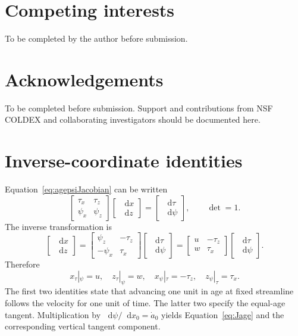 \documentclass[review]{igs}
\theoremstyle{definition}
\theoremstyle{remark}
\newcommand{\dd}{\mathop{}\!\mathrm{d}}
\begin{document}
\section*{Competing interests}
To be completed by the author before submission.

\section*{Acknowledgements}
To be completed before submission. Support and contributions from NSF COLDEX and collaborating investigators should be documented here.




\appendix

\section{Inverse-coordinate identities}
\label{app:inverse}

Equation~\eqref{eq:agepsiJacobian} can be written
\begin{equation}
\begin{bmatrix}
\tau_x & \tau_z\\
\psi_x & \psi_z
\end{bmatrix}
\begin{bmatrix}
\dd x\\
\dd z
\end{bmatrix}
=
\begin{bmatrix}
\dd\tau\\
\dd\psi
\end{bmatrix},
\qquad
\det=1.
\end{equation}
The inverse transformation is
\begin{equation}
\begin{bmatrix}
\dd x\\
\dd z
\end{bmatrix}
=
\begin{bmatrix}
\psi_z & -\tau_z\\
-\psi_x & \tau_x
\end{bmatrix}
\begin{bmatrix}
\dd\tau\\
\dd\psi
\end{bmatrix}
=
\begin{bmatrix}
 u & -\tau_z\\
 w & \tau_x
\end{bmatrix}
\begin{bmatrix}
\dd\tau\\
\dd\psi
\end{bmatrix}.
\label{eq:inversemap}
\end{equation}
Therefore
\begin{equation}
 x_{\tau}|_{\psi}=u,
 \quad
 z_{\tau}|_{\psi}=w,
 \quad
 x_{\psi}|_{\tau}=-\tau_z,
 \quad
 z_{\psi}|_{\tau}=\tau_x.
\end{equation}
The first two identities state that advancing one unit in age at fixed streamline follows the velocity for one unit of time. The latter two specify the equal-age tangent. Multiplication by \(\dd\psi/\dd x_0=\dot a_0\) yields Equation~\eqref{eq:Jage} and the corresponding vertical tangent component.
\end{document}
